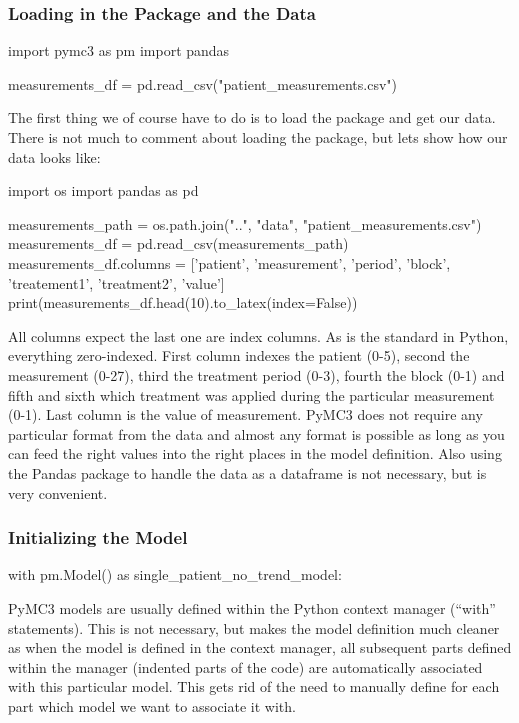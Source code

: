 \documentclass[12pt,a4paper,leqno]{report}
\theoremstyle{plain}
\theoremstyle{definition}
\theoremstyle{remark}
\begin{document}
\subsubsection{Loading in the Package and the Data}

\bigskip
\begin{pyverbatim}
import pymc3 as pm
import pandas

measurements_df = pd.read_csv("patient_measurements.csv")
\end{pyverbatim}
\bigskip

The first thing we of course have to do is to load the package and get our data. There is
not much to comment about loading the package, but lets show how our data looks like:

\bigskip
\begin{pycode}
import os
import pandas as pd

measurements_path = os.path.join("..", "data", "patient_measurements.csv")
measurements_df = pd.read_csv(measurements_path)
measurements_df.columns = ['patient', 'measurement', 'period', 'block',
'treatement1', 'treatment2', 'value']
print(measurements_df.head(10).to_latex(index=False))
\end{pycode}
\bigskip

All columns expect the last one are index columns. As is the standard in Python, everything
zero-indexed. First column indexes the patient (0-5), second the
measurement (0-27), third the treatment period (0-3), fourth the block (0-1) and fifth
and sixth which treatment was applied during the particular measurement (0-1). Last
column is the value of measurement. PyMC3 does not require any particular format from the
data and almost any format is possible as long as you can feed the right values into
the right places in the model definition. Also using the Pandas package to handle the
data as a dataframe is not necessary, but is very convenient.

\subsubsection{Initializing the Model}

\bigskip
\begin{pyverbatim}
with pm.Model() as single_patient_no_trend_model:
\end{pyverbatim}
\bigskip

PyMC3 models are usually defined within the Python context manager (``with'' statements).
This is not necessary, but makes the model definition much cleaner as when the model is
defined in the context manager, all subsequent parts defined within the manager
(indented parts of the code) are automatically associated with this particular model.
This gets rid of the need to manually define for each part which model we want to associate it with.
\end{document}
